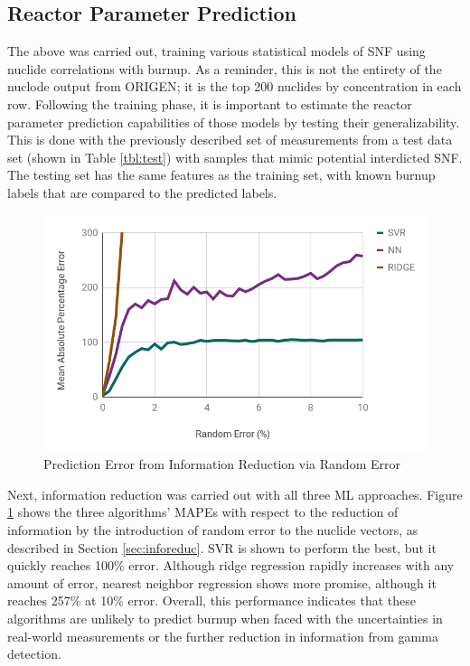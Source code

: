 \subsection{Reactor Parameter Prediction}
\label{sec:rxtrparam}

The above was carried out, training various statistical models of \gls{SNF}
using nuclide correlations with burnup. As a reminder, this is not the entirety
of the nuclode output from \gls{ORIGEN}; it is the top 200 nuclides by
concentration in each row. Following the training phase, it is important to
estimate the reactor parameter prediction capabilities of those models by
testing their generalizability.  This is done with the previously described set
of measurements from a test data set (shown in Table \ref{tbl:test}) with
samples that mimic potential interdicted \gls{SNF}. The testing set has the
same features as the training set, with known burnup labels that are compared
to the predicted labels. 

\begin{figure}[!htb]
  \centering
  \includegraphics[width=\linewidth]{./chapters/demo_method/randerr.png}
  \caption{Prediction Error from Information Reduction via Random Error}
  \label{fig:randerr}
\end{figure}

Next, information reduction was carried out with all three \gls{ML} approaches.
Figure \ref{fig:randerr} shows the three algorithms' \glspl{MAPE} with respect
to the reduction of information by the introduction of random error to the
nuclide vectors, as described in Section \ref{sec:inforeduc}.  \gls{SVR} is
shown to perform the best, but it quickly reaches 100\% error.   Although ridge regression rapidly increases with
any amount of error, nearest neighbor regression shows more promise, although
it reaches 257\% at 10\% error.  Overall, this performance indicates that these
algorithms are unlikely to predict burnup when faced with the uncertainties in
real-world measurements or the further reduction in information from gamma
detection.

